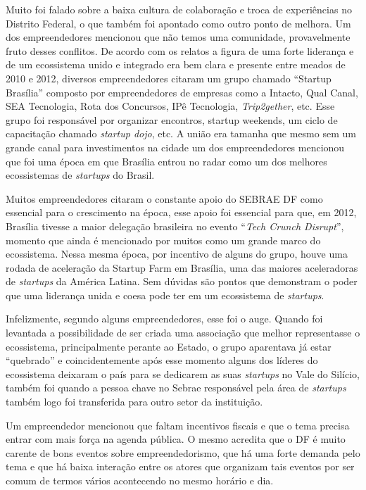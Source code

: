 Muito foi falado sobre a baixa cultura de colaboração e troca de experiências no Distrito Federal, o que também foi apontado como outro ponto de melhora. Um dos empreendedores mencionou que não temos uma comunidade, provavelmente fruto desses conflitos. De acordo com os relatos a figura de uma forte liderança e de um ecossistema unido e integrado era bem clara e presente entre meados de 2010 e 2012, diversos empreendedores citaram um grupo chamado ``Startup Brasília'' composto por empreendedores de empresas como a Intacto, Qual Canal, SEA Tecnologia, Rota dos Concursos, IPê Tecnologia, \textit{Trip2gether}, etc. Esse grupo foi responsável por organizar encontros, startup weekends, um ciclo de capacitação chamado \textit{startup dojo}, etc. A união era tamanha que mesmo sem um grande canal para investimentos na cidade um dos empreendedores mencionou que foi uma época em que Brasília entrou no radar como um dos melhores ecossistemas de \textit{startups} do Brasil. 

Muitos empreendedores citaram o constante apoio do SEBRAE DF como essencial para o crescimento na época, esse apoio foi essencial para que, em 2012, Brasília tivesse a maior delegação brasileira no evento ``\textit{Tech Crunch Disrupt}'', momento que ainda é mencionado por muitos como um grande marco do ecossistema. Nessa mesma época, por incentivo de alguns do grupo, houve uma rodada de aceleração da Startup Farm em Brasília, uma das maiores aceleradoras de \textit{startups} da América Latina. Sem dúvidas são pontos que demonstram o poder que uma liderança unida e coesa pode ter em um ecossistema de \textit{startups}. 

Infelizmente, segundo alguns empreendedores, esse foi o auge. Quando foi levantada a possibilidade de ser criada uma associação que melhor representasse o ecossistema, principalmente perante ao Estado, o grupo aparentava já estar ``quebrado'' e coincidentemente após esse momento alguns dos líderes do ecossistema deixaram o país para se dedicarem as suas \textit{startups} no Vale do Silício, também foi quando a pessoa chave no Sebrae responsável pela área de \textit{startups} também logo foi transferida para outro setor da instituição.

Um empreendedor mencionou que faltam incentivos fiscais e que o tema precisa entrar com mais força na agenda pública. O mesmo acredita que o DF é muito carente de bons eventos sobre empreendedorismo, que há uma forte demanda pelo tema e que há baixa interação entre os atores que organizam tais eventos por ser comum de termos vários acontecendo no mesmo horário e dia. 


